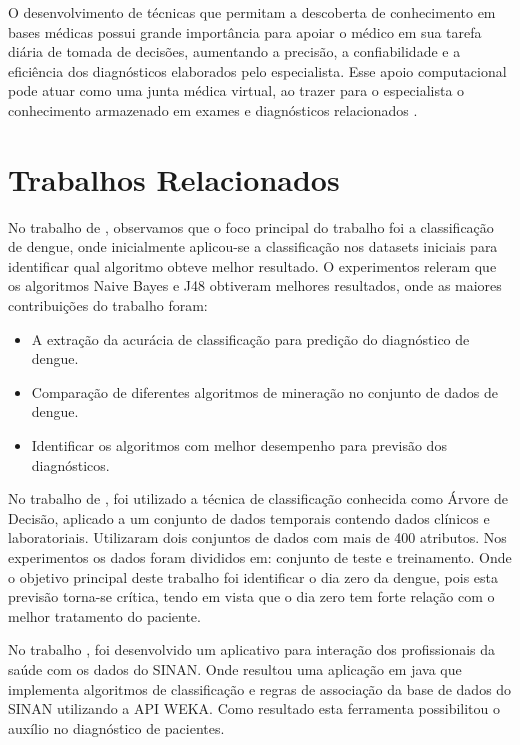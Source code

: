\documentclass[
	12pt,				%
	openright,			%
	oneside,	
	a4paper,				%
	english,				%
	brazil				%
]{abntex2/abntex2} %
\begin{document}
	O desenvolvimento de técnicas que permitam a descoberta de conhecimento em bases médicas possui grande importância para apoiar o médico em sua tarefa diária de tomada de decisões, aumentando a precisão, a confiabilidade e a eficiência dos diagnósticos elaborados pelo especialista. Esse apoio computacional pode atuar como uma junta médica virtual, ao trazer para o especialista o conhecimento armazenado em exames e diagnósticos relacionados \cite{costa:2012}.
	
	\section{Trabalhos Relacionados}	
	
	No trabalho de \cite{shakil:2015}, observamos que o foco principal do trabalho foi a classificação de dengue, onde inicialmente aplicou-se a classificação nos datasets iniciais para identificar qual algoritmo obteve melhor resultado. O experimentos releram que os algoritmos Naive Bayes e J48 obtiveram melhores resultados, onde as maiores contribuições do trabalho foram:
	
	\begin{itemize}
		\item A extração da acurácia de classificação para predição do diagnóstico de dengue.
		\item Comparação de diferentes algoritmos de mineração no conjunto de dados de dengue.
		\item Identificar os algoritmos com melhor desempenho para previsão dos diagnósticos.
	\end{itemize}
	
	No trabalho de \cite{thitiprayoonwongse:2012}, foi utilizado a técnica de classificação conhecida como Árvore de Decisão, aplicado a um conjunto de dados temporais contendo dados clínicos e laboratoriais. Utilizaram dois conjuntos de dados com mais de 400 atributos. Nos experimentos os dados foram divididos em: conjunto de teste e treinamento. Onde o objetivo principal deste trabalho foi identificar o dia zero da dengue, pois esta previsão torna-se crítica, tendo em vista que o dia zero tem forte relação com o melhor tratamento do paciente.
	
	No trabalho \cite{santos:2011}, foi desenvolvido um aplicativo para interação dos profissionais da saúde com os dados do SINAN. Onde resultou uma aplicação em java que implementa algoritmos de classificação e regras de associação da base de dados do SINAN utilizando a API WEKA. Como resultado esta ferramenta possibilitou o auxílio no diagnóstico de pacientes.	
\end{document}
